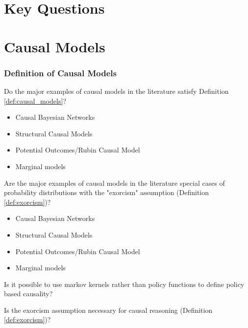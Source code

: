 
\section{Key Questions}

\section{Causal Models}

\subsubsection{Definition of Causal Models}

\begin{question}
    Do the major examples of causal models in the literature satisfy Definition \ref{def:causal_models}?
    \begin{itemize}
        \item Causal Bayesian Networks
        \item Structural Causal Models
        \item Potential Outcomes/Rubin Causal Model
        \item Marginal models
    \end{itemize}
\end{question}

\begin{question}
    Are the major examples of causal models in the literature special cases of probability distributions with the "exorcism" assumption (Definition \ref{def:exorcism})?
    \begin{itemize}
        \item Causal Bayesian Networks
        \item Structural Causal Models
        \item Potential Outcomes/Rubin Causal Model
        \item Marginal models
    \end{itemize}
\end{question}

\begin{question}
    Is it possible to use markov kernels rather than policy functions to define policy based causality?
\end{question}

\begin{question}
    Is the exorcism assumption necessary for causal reasoning (Definition \ref{def:exorcism})?
\end{question}

